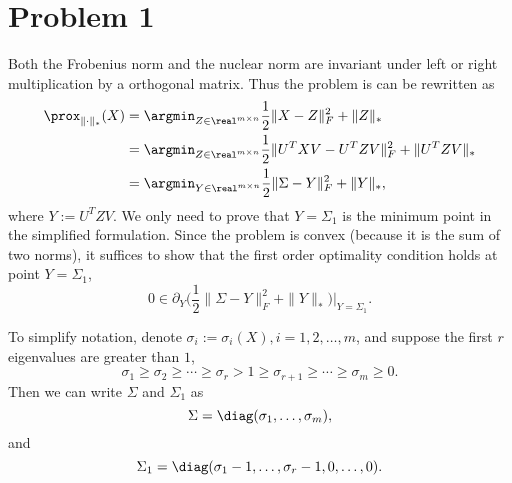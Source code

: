 \section{Problem 1}

Both the Frobenius norm and the nuclear norm are invariant
under left or right multiplication by a orthogonal matrix.
Thus the problem is can be rewritten as
\begin{equation}
\begin{split}
    \prox_{\|\cdot\|_*}(X)
        &= \argmin_{Z\in\real^{m\times n}}\frac{1}{2}\|X-Z\|_F^2+\|Z\|_* \\
        &= \argmin_{Z\in\real^{m\times n}}\frac{1}{2}\|U^TXV-U^TZV\|_F^2+\|U^TZV\|_* \\
        &= \argmin_{Y\in\real^{m\times n}}\frac{1}{2}\|\Sigma-Y\|_F^2+\|Y\|_*, \\
\end{split}
\end{equation}
where $Y:=U^TZV$.
We only need to prove that $Y=\Sigma_1$ is the minimum point
in the simplified formulation.
Since the problem is convex (because it is the sum of two norms),
it suffices to show that the first order optimality condition holds
at point $Y=\Sigma_1$,
\begin{equation}
    0\in \partial_Y\bigg(\frac{1}{2}\|\Sigma-Y\|_F^2+\|Y\|_*\bigg)\bigg|_{Y=\Sigma_1}.
\end{equation}

To simplify notation,
denote $\sigma_i:=\sigma_i(X), i=1,2,\dots,m$,
and suppose the first $r$ eigenvalues are greater than $1$,
\ie
\begin{equation}
    \sigma_1\ge\sigma_2\ge\cdots\ge\sigma_r>1\ge\sigma_{r+1}\ge\cdots\ge\sigma_m\ge0.
\end{equation}
Then we can write $\Sigma$ and $\Sigma_1$ as
\begin{equation}
    \Sigma=\diag(\sigma_1,\dots,\sigma_m),
\end{equation}
and
\begin{equation}
    \Sigma_1=\diag(\sigma_1-1,\dots,\sigma_r-1,0,\dots,0).
\end{equation}

